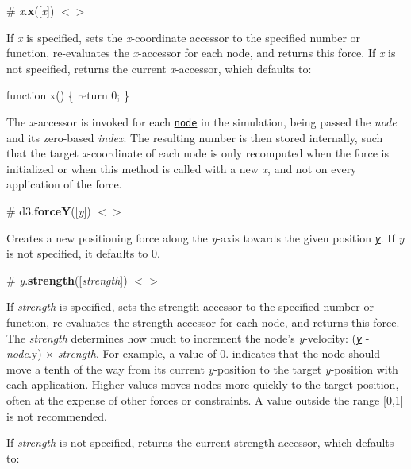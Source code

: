\label{_x_x}%
\# {\itshape x}.{\bfseries x}(\mbox{[}{\itshape x}\mbox{]}) \href{https://github.com/d3/d3-force/blob/master/src/x.js#L36}{\tt $<$$>$}

If {\itshape x} is specified, sets the {\itshape x}-\/coordinate accessor to the specified number or function, re-\/evaluates the {\itshape x}-\/accessor for each node, and returns this force. If {\itshape x} is not specified, returns the current {\itshape x}-\/accessor, which defaults to\+:


\begin{DoxyCode}
function x() \{
  return 0;
\}
\end{DoxyCode}


The {\itshape x}-\/accessor is invoked for each \href{#simulation_nodes}{\tt node} in the simulation, being passed the {\itshape node} and its zero-\/based {\itshape index}. The resulting number is then stored internally, such that the target {\itshape x}-\/coordinate of each node is only recomputed when the force is initialized or when this method is called with a new {\itshape x}, and not on every application of the force.

\label{_forceY}%
\# d3.{\bfseries forceY}(\mbox{[}{\itshape y}\mbox{]}) \href{https://github.com/d3/d3-force/blob/master/src/y.js}{\tt $<$$>$}

Creates a new positioning force along the {\itshape y}-\/axis towards the given position \href{#y_y}{\tt {\itshape y}}. If {\itshape y} is not specified, it defaults to 0.

\label{_y_strength}%
\# {\itshape y}.{\bfseries strength}(\mbox{[}{\itshape strength}\mbox{]}) \href{https://github.com/d3/d3-force/blob/master/src/y.js#L32}{\tt $<$$>$}

If {\itshape strength} is specified, sets the strength accessor to the specified number or function, re-\/evaluates the strength accessor for each node, and returns this force. The {\itshape strength} determines how much to increment the node’s {\itshape y}-\/velocity\+: (\href{#y_y}{\tt {\itshape y}} -\/ {\itshape node}.y) × {\itshape strength}. For example, a value of 0. indicates that the node should move a tenth of the way from its current {\itshape y}-\/position to the target {\itshape y}-\/position with each application. Higher values moves nodes more quickly to the target position, often at the expense of other forces or constraints. A value outside the range \mbox{[}0,1\mbox{]} is not recommended.

If {\itshape strength} is not specified, returns the current strength accessor, which defaults to\+:


